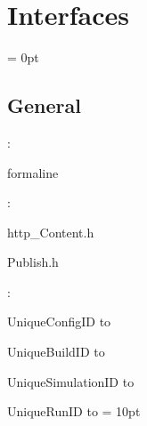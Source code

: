 
\section{Interfaces} 


\parskip = 0pt

\vspace{3mm} \subsection*{General}

: 

formaline
\vspace{2mm}

\vspace{5mm}

: 

http\_Content.h

Publish.h
\vspace{2mm}

: 



UniqueConfigID to 

UniqueBuildID to 

UniqueSimulationID to 

UniqueRunID to 
\vspace{2mm}\parskip = 10pt 
